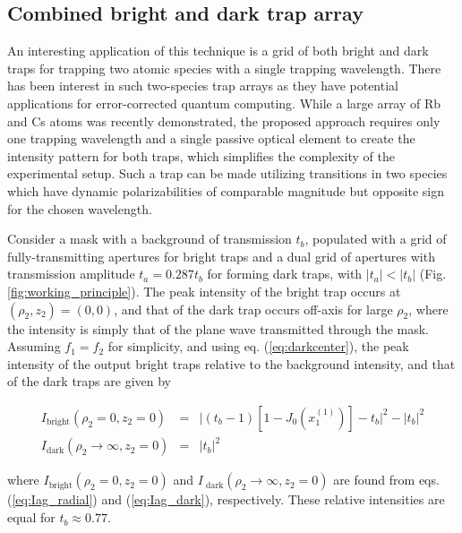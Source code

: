 \subsection{Combined bright and dark trap array}

An   interesting application of this technique is a grid of both bright and dark traps for trapping two atomic species with a single trapping wavelength. There has been interest in such two-species trap arrays as they have potential applications for error-corrected quantum computing\cite{Beterov2015}. While a large array of Rb and Cs atoms was recently demonstrated\cite{Singh2022}, the proposed approach requires only one trapping wavelength and a single passive optical element to create the intensity pattern for both traps, which simplifies the complexity  of the experimental setup. Such a trap can be made utilizing transitions in two species which have dynamic polarizabilities of comparable magnitude but opposite sign for the chosen wavelength.

Consider a mask with a background of transmission $t_b$, populated with a grid of fully-transmitting apertures for  bright traps and a dual grid of apertures with transmission amplitude $t_a = 0.287 t_b$ for forming dark traps, with $\left|t_a\right| < \left|t_b\right|$ (Fig. \ref{fig:working_principle}). The peak intensity of the bright trap occurs at $(\rho_2,z_2)=(0,0)$, and that of the dark trap occurs off-axis for large $\rho_2$, where the intensity is simply that of the plane wave transmitted through the mask. Assuming $f_1 = f_2$ for simplicity, and using eq. (\ref{eq:darkcenter}), the peak intensity of the output bright traps relative to the background intensity, and that of the dark traps are given by

\begin{eqnarray}
    I_{\text {bright}}(\rho_2=0,z_2=0) &=
    &\bigg|\left(t_{b}-1\right)\left[1-J_{0}\left(x_1^{(1)}\right)\right]  - t_{b}\bigg|^{2} -\left| t_{b} \right| ^{2}\\
    I_{\text{dark}}(\rho_2\rightarrow\infty,z_2=0) &=& \left|t_b \right|^2
\end{eqnarray}

where $I_{\text {bright}}(\rho_2=0,z_2=0)$ and $I_{\text{ dark}}(\rho_2\rightarrow\infty,z_2=0)$ are found from eqs. (\ref{eq:Iag_radial}) and (\ref{eq:Iag_dark}), respectively. These relative intensities are equal for $t_b\approx0.77$.

